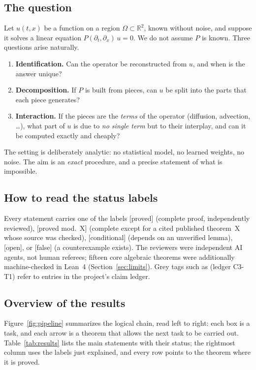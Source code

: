 \documentclass[11pt,a4paper]{article}
\theoremstyle{definition}
\newcommand{\badge}[2]{\textcolor{#1}{\textsf{\footnotesize[#2]}}}
\newcommand{\proved}[1][]{\badge{cC}{proved#1}}
\newcommand{\modulo}[1]{\badge{cD}{proved mod.\ #1}}
\newcommand{\condl}{\badge{cD}{conditional}}
\newcommand{\openq}{\badge{cB}{open}}
\newcommand{\falsest}{\badge{cB}{false}}
\newcommand{\led}[1]{\textcolor{cG}{\textsf{\footnotesize(ledger #1)}}}
\newcommand{\R}{\mathbb{R}}\newcommand{\C}{\mathbb{C}}\newcommand{\N}{\mathbb{N}}\newcommand{\Z}{\mathbb{Z}}
\begin{document}
\subsection{The question}
Let $u(t,x)$ be a function on a region $\Omega\subset\R^2$, known without noise, and suppose it solves a linear equation $P(\partial_t,\partial_x)\,u=0$. We do not assume $P$ is known. Three questions arise naturally.
\begin{enumerate}[label=\textbf{Q\arabic*.},leftmargin=1.1cm,nosep]
\item \textbf{Identification.} Can the operator be reconstructed from $u$, and when is the answer unique?
\item \textbf{Decomposition.} If $P$ is built from pieces, can $u$ be split into the parts that each piece generates?
\item \textbf{Interaction.} If the pieces are the \emph{terms} of the operator (diffusion, advection, \dots), what part of $u$ is due to \emph{no single term} but to their interplay, and can it be computed exactly and cheaply?
\end{enumerate}
The setting is deliberately analytic: no statistical model, no learned weights, no noise. The aim is an \emph{exact} procedure, and a precise statement of what is impossible.

\subsection{How to read the status labels}
Every statement carries one of the labels \proved{} (complete proof, independently reviewed), \modulo{X} (complete except for a cited published theorem~X whose source was checked), \condl{} (depends on an unverified lemma), \openq{}, or \falsest{} (a counterexample exists). The reviewers were independent AI agents, not human referees; fifteen core algebraic theorems were additionally machine-checked in Lean~4 (Section~\ref{sec:limits}). Grey tags such as \led{C3-T1} refer to entries in the project's claim ledger.

\subsection{Overview of the results}
Figure~\ref{fig:pipeline} summarizes the logical chain, read left to right: each box is a task, and each arrow is a theorem that allows the next task to be carried out. Table~\ref{tab:results} lists the main statements with their status; the rightmost column uses the labels just explained, and every row points to the theorem where it is proved.
\end{document}
